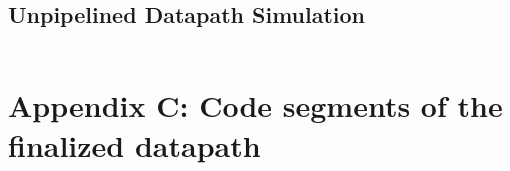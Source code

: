 \subsection{Unpipelined Datapath Simulation}
\begin{code}
\label{code:DPP_TB}  
\inputminted[fontsize=\footnotesize]{vhdl}{\simfolder WB_testbench.vhd}
\end{code}
\newpage

\section{Appendix C: Code segments of the finalized datapath}